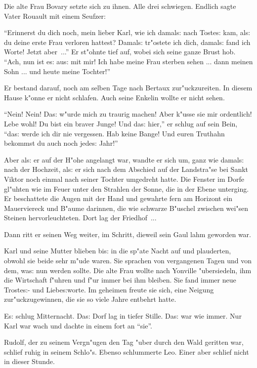 \documentclass[oneside,12pt]{book}
\newcommand{\s}{s:}%
\begin{document}
Die alte Frau Bovary setzte sich zu ihnen. Alle drei schwiegen.
Endlich sagte Vater Rouault mit einem Seufzer:

"`Erinnerst du dich noch, mein lieber Karl, wie ich damal{\s} nach
Toste{\s} kam, al{\s} du deine erste Frau verloren hattest?
Damal{\s} tr"ostete ich dich, damal{\s} fand ich Worte! Jetzt
aber~..."' Er st"ohnte tief auf, wobei sich seine ganze Brust
hob. "`Ach, nun ist e{\s} au{\s} mit mir! Ich habe meine Frau
sterben sehen ... dann meinen Sohn ... und heute meine
Tochter!"'

Er bestand darauf, noch am selben Tage nach Bertaux
zur"uckzureiten. In diesem Hause k"onne er nicht schlafen. Auch
seine Enkelin wollte er nicht sehen.

"`Nein! Nein! Da{\s} w"urde mich zu traurig machen! Aber k"usse
sie mir ordentlich! Lebe wohl! Du bist ein braver Junge! Und
da{\s} hier,"' er schlug auf sein Bein, "`da{\s} werde ich dir nie
vergessen. Hab keine Bange! Und euren Truthahn bekommst du auch
noch jede{\s} Jahr!"'

Aber al{\s} er auf der H"ohe angelangt war, wandte er sich um,
ganz wie damal{\s} nach der Hochzeit, al{\s} er sich nach dem
Abschied auf der Landstra"se bei Sankt Viktor noch einmal nach
seiner Tochter umgedreht hatte. Die Fenster im Dorfe gl"uhten wie
im Feuer unter den Strahlen der Sonne, die in der Ebene unterging.
Er beschattete die Augen mit der Hand und gewahrte fern am
Horizont ein Mauerviereck und B"aume darinnen, die wie schwarze
B"uschel zwischen wei"sen Steinen hervorleuchteten. Dort lag der
Friedhof~...

Dann ritt er seinen Weg weiter, im Schritt, dieweil sein Gaul lahm
geworden war.

Karl und seine Mutter blieben bi{\s} in die sp"ate Nacht auf und
plauderten, obwohl sie beide sehr m"ude waren. Sie sprachen von
vergangenen Tagen und von dem, wa{\s} nun werden sollte. Die alte
Frau wollte nach Yonville "ubersiedeln, ihm die Wirtschaft f"uhren
und f"ur immer bei ihm bleiben. Sie fand immer neue Troste{\s}-
und Liebe{\s}worte. Im geheimen freute sie sich, eine Neigung
zur"uckzugewinnen, die sie so viele Jahre entbehrt hatte.

E{\s} schlug Mitternacht. Da{\s} Dorf lag in tiefer Stille. Da{\s}
war wie immer. Nur Karl war wach und dachte in einem fort an
"`sie"'.

Rudolf, der zu seinem Vergn"ugen den Tag "uber durch den Wald
geritten war, schlief ruhig in seinem Schlo"s. Ebenso schlummerte
Leo. Einer aber schlief nicht in dieser Stunde.
\end{document}
